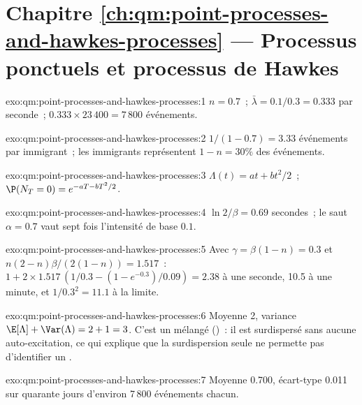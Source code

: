 \section*{Chapitre \ref{ch:qm:point-processes-and-hawkes-processes} --- Processus ponctuels et processus de Hawkes}

\begin{solution}{exo:qm:point-processes-and-hawkes-processes:1}
$n = 0.7$~; $\bar\lambda = 0.1/0.3 = 0.333$ par seconde~; $0.333 \times 23\,400 = 7\,800$ événements.
\end{solution}

\begin{solution}{exo:qm:point-processes-and-hawkes-processes:2}
$1/(1 - 0.7) = 3.33$ événements par immigrant~; les immigrants représentent $1 - n = 30\%$ des événements.
\end{solution}

\begin{solution}{exo:qm:point-processes-and-hawkes-processes:3}
$\Lambda(t) = at + bt^2/2$~; $\P(N_T = 0) = e^{-aT - bT^2/2}$.
\end{solution}

\begin{solution}{exo:qm:point-processes-and-hawkes-processes:4}
$\ln 2/\beta = 0.69$ secondes~; le saut $\alpha = 0.7$ vaut sept fois l'intensité de base $0.1$.
\end{solution}

\begin{solution}{exo:qm:point-processes-and-hawkes-processes:5}
Avec $\gamma = \beta(1 - n) = 0.3$ et $n(2 - n)\beta/(2(1 - n)) = 1.517$~: $1 + 2 \times 1.517\,(1/0.3 - (1 - e^{-0.3})/0.09) = 2.38$ à
une seconde, 10.5 à une minute, et $1/0.3^2 = 11.1$ à la limite.
\end{solution}

\begin{solution}{exo:qm:point-processes-and-hawkes-processes:6}
Moyenne 2, variance $\E[\Lambda] + \Var(\Lambda) = 2 + 1 = 3$. C'est un  mélangé ()~: il est surdispersé sans aucune
auto-excitation, ce qui explique que la surdispersion seule ne permette pas d'identifier un .
\end{solution}

\begin{solution}{exo:qm:point-processes-and-hawkes-processes:7}
Moyenne 0.700, écart-type 0.011 sur quarante jours d'environ 7\,800 événements chacun.
\end{solution}

